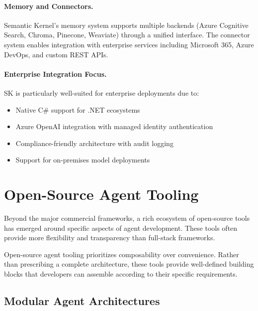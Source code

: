 \paragraph{Memory and Connectors.}
\label{memory-and-connectors.}

Semantic Kernel’s memory system supports multiple backends (Azure Cognitive Search, Chroma, Pinecone, Weaviate) through a unified interface. The connector system enables integration with enterprise services including Microsoft 365, Azure DevOps, and custom REST APIs.

\paragraph{Enterprise Integration Focus.}
\label{enterprise-integration-focus.}

SK is particularly well-suited for enterprise deployments due to:

\begin{itemize}
  \item Native C\# support for .NET ecosystems
  \item Azure OpenAI integration with managed identity authentication
  \item Compliance-friendly architecture with audit logging
  \item Support for on-premises model deployments
\end{itemize}

\section{Open-Source Agent Tooling}
\label{subsec:open-source-tooling}

Beyond the major commercial frameworks, a rich ecosystem of open-source tools has emerged around specific aspects of agent development. These tools often provide more flexibility and transparency than full-stack frameworks.

\begin{keybox}
Open-source agent tooling prioritizes composability over convenience. Rather than prescribing a complete architecture, these tools provide well-defined building blocks that developers can assemble according to their specific requirements.
\end{keybox}

\subsection{Modular Agent Architectures}
\label{modular-agent-architectures}

